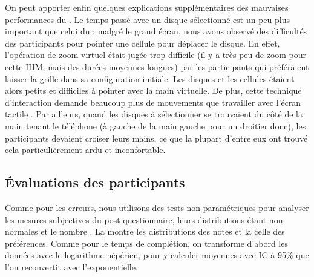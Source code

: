 On peut apporter enfin quelques explications supplémentaires des mauvaises performances du . Le temps passé avec un disque sélectionné est un peu plus important que celui du  : malgré le grand écran, nous avons observé des difficultés des participants pour pointer une cellule pour déplacer le disque. En effet, l'opération de zoom virtuel était jugée trop difficile (il y a très peu de zoom pour cette IHM, mais des durées moyennes longues) par les participants qui préféraient laisser la grille dans sa configuration initiale. Les disques et les cellules étaient alors petits et difficiles à pointer avec la main virtuelle. De plus, cette technique d'interaction demande beaucoup plus de mouvements que travailler avec l'écran tactile . Par ailleurs, quand les disques à sélectionner se trouvaient du côté de la main tenant le téléphone (à gauche de la main gauche pour un droitier donc), les participants devaient croiser leurs mains, ce que la plupart d'entre eux ont trouvé cela particulièrement ardu et inconfortable.


\subsection{Évaluations des participants}
\label{subsec:experiment_results_evaluations}



Comme pour les erreurs, nous utilisons des tests non-paramétriques pour analyser les mesures subjectives du post-questionnaire, leurs distributions étant non-normales et le nombre \cite{Wobbrock2016}. La  montre les distributions des notes et la  celle des préférences. Comme pour le temps de complétion, on transforme d'abord les données avec le logarithme népérien, pour y calculer moyennes avec IC à 95\% que l'on reconvertit avec l'exponentielle.

